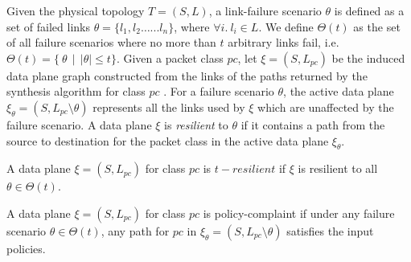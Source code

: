 Given the physical topology $T=(S,L)$, a link-failure
scenario $\theta$ is defined as a set of failed links $\theta = \{l_1, l_2 \ldots ... l_n\}$,
where $\forall i.\ l_i \in L$.
	We define $\Theta(t)$ as the set of all failure scenarios where no more than $t$
	arbitrary links fail, i.e. $\Theta(t) = \{ \ \theta \ \ | \ \ |\theta| \leq t\}$.
Given a packet class $pc$,
let $\xi = (S, L_{pc})$ be the induced data plane graph constructed from the links
of the paths returned by the synthesis algorithm for class $pc$ .
 For a failure scenario
$\theta$, the active data plane $\xi_\theta = (S, L_{pc} \setminus \theta)$ represents
all the links used by $\xi$ which are unaffected by the failure scenario. A data
plane $\xi$ is {\em resilient} to $\theta$ if it contains a path from the source to 
destination for the packet class in the active data plane $\xi_\theta$.
\begin{mydef}[Resilience]
	A data plane $\xi = (S, L_{pc})$ for class $pc$ is $t-resilient$ if $\xi$ is 
	resilient to all $\theta \in \Theta(t)$.
\end{mydef}
\begin{mydef}
	A data plane $\xi = (S, L_{pc})$ for class $pc$ is policy-complaint if under
	any failure scenario $\theta \in \Theta(t)$, any path for $pc$ in 
	$\xi_\theta=(S, L_{pc} \setminus \theta)$ satisfies the input policies. 
\end{mydef}
